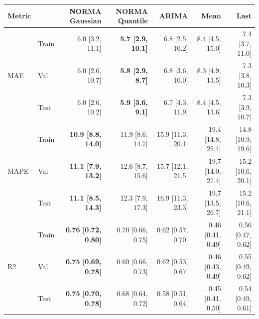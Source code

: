 \begin{table}[ht]
\centering
\footnotesize
\begin{tabular}{llrrrrr}
\toprule
Metric & & NORMA Gaussian & NORMA Quantile & ARIMA & Mean & Last \\
\midrule
\multirow{3}{*}{MAE} & Train & 6.0 [3.2, 11.1] & \textbf{5.7 [2.9, 10.1]} & 6.8 [2.5, 10.2] & 8.4 [4.5, 15.0] & 7.4 [3.7, 11.0] \\
 & Val & 6.0 [2.6, 10.7] & \textbf{5.8 [2.9, 8.7]} & 6.8 [3.6, 10.0] & 8.3 [4.9, 13.5] & 7.3 [3.8, 10.3] \\
 & Test & 6.0 [2.6, 10.2] & \textbf{5.9 [3.6, 9.1]} & 6.7 [4.3, 11.9] & 8.4 [4.5, 13.6] & 7.3 [3.9, 10.7] \\
\midrule
\multirow{3}{*}{MAPE} & Train & \textbf{10.9 [8.8, 14.0]} & 11.9 [8.6, 14.7] & 15.9 [11.3, 20.1] & 19.4 [14.8, 25.4] & 14.8 [10.9, 19.6] \\
 & Val & \textbf{11.1 [7.9, 13.2]} & 12.6 [8.7, 15.6] & 15.7 [12.1, 21.5] & 19.7 [14.0, 27.4] & 15.2 [10.6, 20.1] \\
 & Test & \textbf{11.1 [8.5, 14.3]} & 12.3 [7.9, 17.3] & 16.9 [11.3, 23.3] & 19.7 [13.5, 26.7] & 15.2 [10.6, 21.1] \\
\midrule
\multirow{3}{*}{R2} & Train & \textbf{0.76 [0.72, 0.80]} & 0.70 [0.66, 0.75] & 0.62 [0.57, 0.70] & 0.46 [0.41, 0.49] & 0.56 [0.47, 0.62] \\
 & Val & \textbf{0.75 [0.69, 0.78]} & 0.69 [0.66, 0.73] & 0.62 [0.53, 0.67] & 0.46 [0.43, 0.49] & 0.55 [0.49, 0.62] \\
 & Test & \textbf{0.75 [0.70, 0.78]} & 0.68 [0.64, 0.72] & 0.58 [0.51, 0.64] & 0.45 [0.41, 0.50] & 0.54 [0.49, 0.61] \\
\bottomrule
\end{tabular}
\label{tab:prediction_performance}
\end{table}